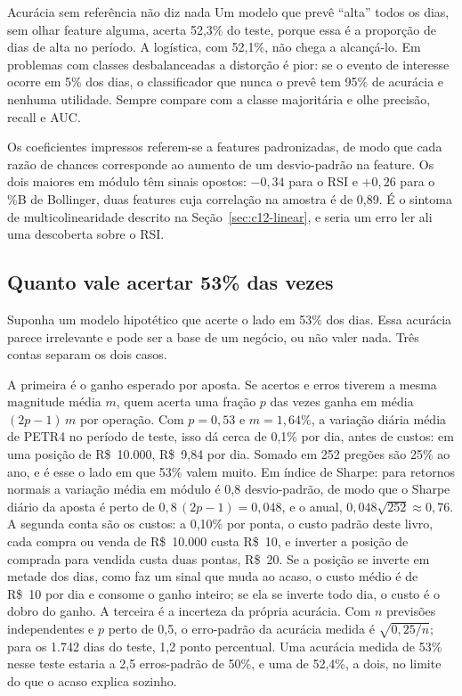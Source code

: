 \begin{armadilha}{Acurácia sem referência não diz nada}
Um modelo que prevê ``alta'' todos os dias, sem olhar feature alguma, acerta 52,3\% do teste, porque essa é a proporção de dias de alta no período. A logística, com 52,1\%, não chega a alcançá-lo. Em problemas com classes desbalanceadas a distorção é pior: se o evento de interesse ocorre em 5\% dos dias, o classificador que nunca o prevê tem 95\% de acurácia e nenhuma utilidade. Sempre compare com a classe majoritária e olhe precisão, recall e AUC.
\end{armadilha}

Os coeficientes impressos referem-se a features padronizadas, de modo que cada razão de chances corresponde ao aumento de um desvio-padrão na feature. Os dois maiores em módulo têm sinais opostos: $-0,34$ para o RSI e $+0,26$ para o \%B de Bollinger, duas features cuja correlação na amostra é de 0,89. É o sintoma de multicolinearidade descrito na Seção~\ref{sec:c12-linear}, e seria um erro ler ali uma descoberta sobre o RSI.

\subsection{Quanto vale acertar 53\% das vezes}

Suponha um modelo hipotético que acerte o lado em 53\% dos dias. Essa acurácia parece irrelevante e pode ser a base de um negócio, ou não valer nada. Três contas separam os dois casos.

A primeira é o ganho esperado por aposta. Se acertos e erros tiverem a mesma magnitude média $m$, quem acerta uma fração $p$ das vezes ganha em média $(2p - 1)\,m$ por operação. Com $p = 0,53$ e $m = 1,64\%$, a variação diária média de PETR4 no período de teste, isso dá cerca de 0,1\% por dia, antes de custos: em uma posição de R\$~10.000, R\$~9,84 por dia. Somado em 252 pregões são 25\% ao ano, e é esse o lado em que 53\% valem muito. Em índice de Sharpe: para retornos normais a variação média em módulo é 0,8 desvio-padrão, de modo que o Sharpe diário da aposta é perto de $0,8\,(2p - 1) = 0,048$, e o anual, $0,048\sqrt{252} \approx 0,76$. A segunda conta são os custos: a 0,10\% por ponta, o custo padrão deste livro, cada compra ou venda de R\$~10.000 custa R\$~10, e inverter a posição de comprada para vendida custa duas pontas, R\$~20. Se a posição se inverte em metade dos dias, como faz um sinal que muda ao acaso, o custo médio é de R\$~10 por dia e consome o ganho inteiro; se ela se inverte todo dia, o custo é o dobro do ganho. A terceira é a incerteza da própria acurácia. Com $n$ previsões independentes e $p$ perto de 0,5, o erro-padrão da acurácia medida é $\sqrt{0,25/n}$; para os 1.742 dias do teste, 1,2 ponto percentual. Uma acurácia medida de 53\% nesse teste estaria a 2,5 erros-padrão de 50\%, e uma de 52,4\%, a dois, no limite do que o acaso explica sozinho.

